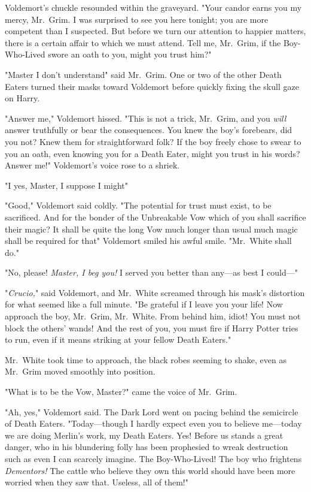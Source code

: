Voldemort's chuckle resounded within the graveyard. "Your candor earns you my
mercy, Mr.~Grim. I was surprised to see you here tonight; you are more
competent than I suspected. But before we turn our attention to happier
matters, there is a certain affair to which we must attend. Tell me, Mr.~Grim,
if the Boy-Who-Lived swore an oath to you, might you trust him?"

"Master{\el} I don't understand{\el}" said Mr.~Grim. One or two of the
other Death Eaters turned their masks toward Voldemort before quickly fixing
the skull gaze on Harry.

"Answer me," Voldemort hissed. "This is not a trick, Mr.~Grim, and you
\emph{will} answer truthfully or bear the consequences. You knew the boy's
forebears, did you not? Knew them for straightforward folk? If the boy freely
chose to swear to you an oath, even knowing you for a Death Eater, might you
trust in his words? Answer me!" Voldemort's voice rose to a shriek.

"I{\el} yes, Master, I suppose I might{\el}"

"Good," Voldemort said coldly. "The potential for trust must exist, to be
sacrificed. And for the bonder of the Unbreakable Vow{\el} which of you
shall sacrifice their magic? It shall be quite the long Vow{\el} much longer
than usual{\el} much magic shall be required for that{\el}" Voldemort
smiled his awful smile. "Mr.~White shall do."

"No, please! \emph{Master, I beg you!} I served you better than any---as best I
could\mbox{---}"

"\emph{Crucio,}" said Voldemort, and Mr.~White screamed through his mask's
distortion for what seemed like a full minute. "Be grateful if I leave you your
life! Now approach the boy, Mr.~Grim, Mr.~White. From behind him, idiot! You
must not block the others' wands! And the rest of you, you must fire if Harry
Potter tries to run, even if it means striking at your fellow Death Eaters."

Mr.~White took time to approach, the black robes seeming to shake, even as
Mr.~Grim moved smoothly into position.

"What is to be the Vow, Master?" came the voice of Mr.~Grim.

"Ah, yes," Voldemort said. The Dark Lord went on pacing behind the semicircle
of Death Eaters. "Today---though I hardly expect even you to believe me---today
we are doing Merlin's work, my Death Eaters. Yes! Before us stands a great
danger, who in his blundering folly has been prophesied to wreak destruction
such as even I can scarcely imagine. The Boy-Who-Lived! The boy who frightens
\emph{Dementors!} The cattle who believe they own this world should have been
more worried when they saw that. Useless, all of them!"

